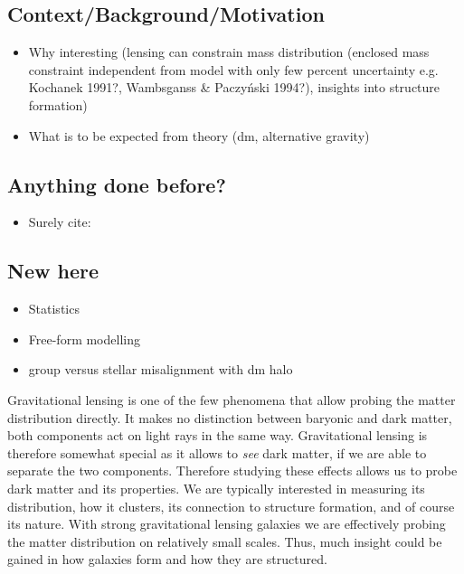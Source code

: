 \documentclass[useAMS,usenatbib]{mn2e}
\begin{document}
\subsection{Context/Background/Motivation}
\begin{itemize}
\item Why interesting (lensing can constrain mass distribution (enclosed mass constraint independent from model with only few percent uncertainty e.g. Kochanek 1991?, Wambsganss \& Paczyński 1994?), insights into structure formation)
\item What is to be expected from theory (dm, alternative gravity)
\end{itemize}


\subsection{Anything done before?}
\begin{itemize}
\item Surely cite: \cite{1997ApJ...482..604K,1998ApJ...509..561K,2006ApJ...649..599K,2009ApJ...690..670T,2012ApJ...761..170G}
\end{itemize}


\subsection{New here}
\begin{itemize}
\item Statistics
\item Free-form modelling
\item group versus stellar misalignment with dm halo
\end{itemize}


Gravitational lensing is one of the few phenomena that allow probing the matter distribution directly. It makes no distinction between baryonic and dark matter, both components act on light rays in the same way. Gravitational lensing is therefore somewhat special as it allows to \textit{see} dark matter, if we are able to separate the two components. Therefore studying these effects allows us to probe dark matter and its properties. We are typically interested in measuring its distribution, how it clusters, its connection to structure formation, and of course its nature. With strong gravitational lensing galaxies we are effectively probing the matter distribution on relatively small scales. Thus, much insight could be gained in how galaxies form and how they are structured.
\end{document}
